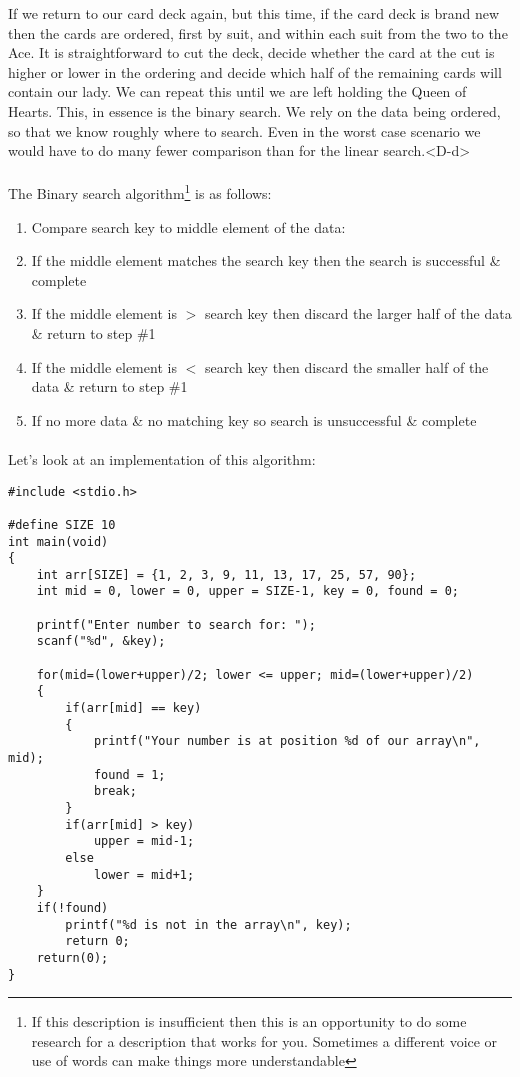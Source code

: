 \documentclass[10pt, a4paper, twosize]{article}
\begin{document}
If we return to our card deck again, but this time, if the card deck is brand new then the cards are ordered, first by suit, and within each suit from the two to the Ace. It is straightforward to cut the deck, decide whether the card at the cut is higher or lower in the ordering and decide which half of the remaining cards will contain our lady. We can repeat this until we are left holding the Queen of Hearts. This, in essence is the binary search. We rely on the data being ordered, so that we know roughly where to search. Even in the worst case scenario we would have to do many fewer comparison than for the linear search.<D-d>


\paragraph{} The Binary search algorithm\footnote{If this description is insufficient then this is an opportunity to do some research for a description that works for you. Sometimes a different voice or use of words can make things more understandable} is as follows:

\begin{enumerate}
\item Compare search key to middle element of the data:
\item If the middle element matches the search key then the search is successful \& complete
\item If the middle element is $>$ search key then discard the larger half of the data \& return to step \#1

\item If the middle element is $<$ search key then discard the smaller half of the data \& return to step \#1
\item If no more data \& no matching key so search is unsuccessful \& complete
\end{enumerate}

\paragraph{} Let's look at an implementation of this algorithm:

\begin{lstlisting}
#include <stdio.h>

#define SIZE 10
int main(void)
{
    int arr[SIZE] = {1, 2, 3, 9, 11, 13, 17, 25, 57, 90};
    int mid = 0, lower = 0, upper = SIZE-1, key = 0, found = 0;

    printf("Enter number to search for: ");
    scanf("%d", &key);

    for(mid=(lower+upper)/2; lower <= upper; mid=(lower+upper)/2)
    {
        if(arr[mid] == key)
        {
            printf("Your number is at position %d of our array\n", mid);
            found = 1;
            break;
        }
        if(arr[mid] > key)
            upper = mid-1;
        else
            lower = mid+1;
    }
    if(!found)
        printf("%d is not in the array\n", key);
        return 0;
    return(0);
}
\end{lstlisting}
\end{document}
